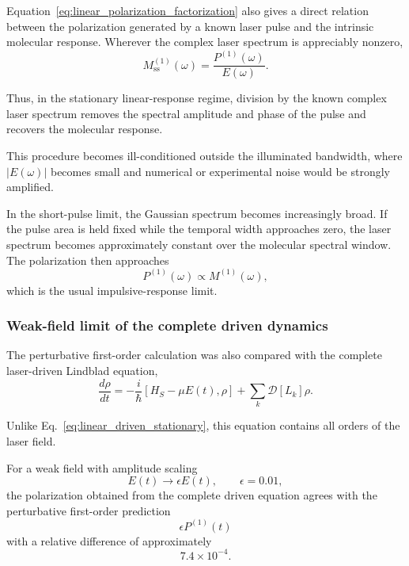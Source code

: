 \documentclass[11pt]{article}
\begin{document}
Equation~\eqref{eq:linear_polarization_factorization} also gives a
direct relation between the polarization generated by a known laser
pulse and the intrinsic molecular response.  Wherever the complex laser
spectrum is appreciably nonzero,
%
\begin{equation}
\boxed{
M_{\mathrm{ss}}^{(1)}(\omega)
=
\frac{
P^{(1)}(\omega)
}{
E(\omega)
}.
}
\label{eq:linear_response_deconvolution}
\end{equation}

Thus, in the stationary linear-response regime, division by the known
complex laser spectrum removes the spectral amplitude and phase of the
pulse and recovers the molecular response.

This procedure becomes ill-conditioned outside the illuminated
bandwidth, where $|E(\omega)|$ becomes small and numerical or
experimental noise would be strongly amplified.

In the short-pulse limit, the Gaussian spectrum becomes increasingly
broad.  If the pulse area is held fixed while the temporal width
approaches zero, the laser spectrum becomes approximately constant over
the molecular spectral window.  The polarization then approaches
%
\begin{equation}
P^{(1)}(\omega)
\propto
M^{(1)}(\omega),
\end{equation}
%
which is the usual impulsive-response limit.


\subsubsection{Weak-field limit of the complete driven dynamics}

The perturbative first-order calculation was also compared with the
complete laser-driven Lindblad equation,
%
\begin{equation}
\boxed{
\frac{d\rho}{dt}
=
-\frac{i}{\hbar}
[H_S-\mu E(t),\rho]
+
\sum_k
\mathcal{D}[L_k]\rho .
}
\label{eq:full_driven_linear_validation}
\end{equation}

Unlike Eq.~\eqref{eq:linear_driven_stationary}, this equation contains
all orders of the laser field.

For a weak field with amplitude scaling
%
\begin{equation}
E(t)
\rightarrow
\epsilon E(t),
\qquad
\epsilon=0.01,
\end{equation}
%
the polarization obtained from the complete driven equation agrees with
the perturbative first-order prediction
%
\begin{equation}
\epsilon P^{(1)}(t)
\end{equation}
%
with a relative difference of approximately
%
\begin{equation}
\boxed{
7.4\times10^{-4}.
}
\label{eq:linear_weak_field_error}
\end{equation}
\end{document}
